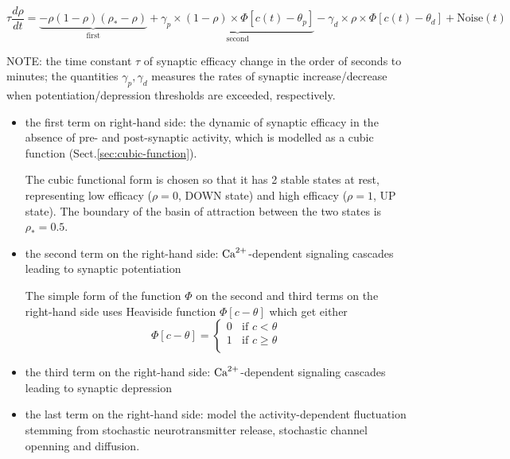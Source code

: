 \begin{equation}
\tau\frac{d\rho}{dt} = \underbrace{-\rho (1-\rho)(\rho_* -
\rho)}_{\text{first}} + 
\underbrace{\gamma_p \times (1-\rho) \times \Phi
[c(t)-\theta_p]}_{\text{second}} - \gamma_d \times \rho \times \Phi [c(t) -
\theta_d] + \text{Noise}(t)
\end{equation}

  NOTE: the time constant $\tau$ of synaptic efficacy change in the order of
  seconds to minutes; the quantities $\gamma_p, \gamma_d$ measures the rates of
  synaptic increase/decrease when potentiation/depression thresholds are
  exceeded, respectively.

\begin{itemize}
  
  \item the first term on right-hand side: the dynamic of synaptic efficacy in
  the absence of pre- and post-synaptic activity, which is modelled as a cubic
  function (Sect.\ref{sec:cubic-function}).
  
  The cubic functional form is chosen so that it has 2 stable states at rest,
  representing low efficacy ($\rho =0$, DOWN state) and high efficacy
  ($\rho=1$, UP state). The boundary of the basin of attraction between the two
  states is $\rho_* = 0.5$.
  
  \item the second term on the right-hand side: ${\text{Ca}^{2+}}$-dependent signaling
  cascades leading to synaptic potentiation 

\begin{mdframed}
The simple form of the function $\Phi$ on the second and third terms on the
right-hand side uses Heaviside function $\Phi[c-\theta]$ which get either
 \begin{equation}
 \Phi[c-\theta] = \left\{ \begin{array}{c}
 		0  \;\; \text{ if } c<\theta \\
 		1  \;\; \text{ if } c\ge\theta \\
                \end{array}\right.
 \end{equation}
\end{mdframed}  

  \item the third term on the right-hand side: ${\text{Ca}^{2+}}$-dependent signaling
  cascades leading to synaptic depression


  
  \item the last term on the right-hand side: model the activity-dependent
  fluctuation stemming from stochastic neurotransmitter release, stochastic
  channel openning and diffusion.
  

\end{itemize}
